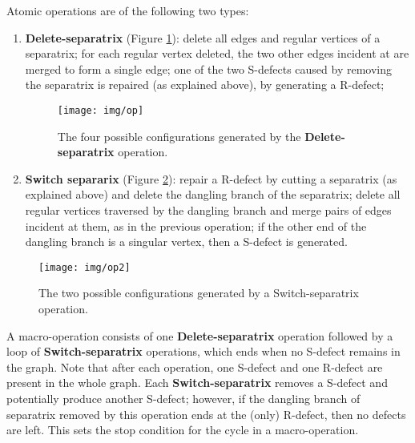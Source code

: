 \documentclass[11pt,a4paper]{article}
\begin{document}
Atomic operations are of the following two types:
\begin{enumerate}
\item \textbf{Delete-separatrix} (Figure \ref{fig:op}): delete all edges and regular vertices of a separatrix; for each regular vertex  deleted, the two other edges incident at  are merged to form a single edge; one of the two S-defects caused by removing the separatrix is repaired (as explained above), by generating a R-defect; 

\begin{figure}
\centering
\mbox{}
\hfill
\centerline{\texttt{[image: img/op]}}


\hfill\mbox{}
\caption{\label{fig:op} The four possible configurations generated by the \textbf{Delete-separatrix} operation.
}
\end{figure}

\item \textbf{Switch separarix} (Figure \ref{fig:op2}): repair a R-defect by cutting a separatrix (as explained above) and delete the dangling branch of the separatrix; delete all regular vertices traversed by the dangling branch and merge pairs of edges incident at them, as in the previous operation; if the other end of the dangling branch is a singular vertex, then a S-defect is generated.
\end{enumerate}

\begin{figure}
\centering
\mbox{}
\hfill
\texttt{[image: img/op2]}


\hfill\mbox{}
\caption{\label{fig:op2} The two possible configurations generated by a Switch-separatrix operation.
}
\end{figure}

A macro-operation consists of one \textbf{Delete-separatrix} operation followed by a loop of \textbf{Switch-separatrix} operations, which ends when no S-defect remains in the graph.
Note that after each operation, one S-defect and one R-defect are present in the whole graph. 
Each \textbf{Switch-separatrix} removes a S-defect and potentially produce another S-defect; however, if the dangling branch of separatrix removed by this operation ends at the (only) R-defect, then no defects are left. 
This sets the stop condition for the cycle in a macro-operation.
\end{document}
